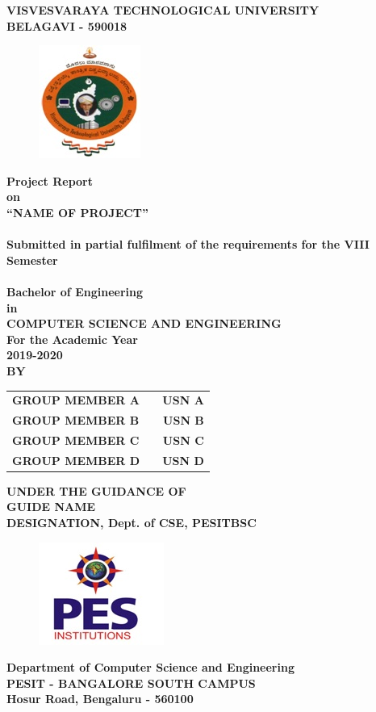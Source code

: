 \newpage
\begin{center}
\thispagestyle{empty}
\Large{\textbf{VISVESVARAYA TECHNOLOGICAL UNIVERSITY\\ \large{BELAGAVI - 590018}}}\\
\begin{figure}[h]
	\centering
	\includegraphics[scale=0.8]{project/images/vtu_new_logo}
	\label{fig:vtulogo}
\end{figure}
\large{\textbf{Project Report\\ on \\}}
\LARGE{\textsc {\textbf{``NAME OF PROJECT''}}}\\
\large{\textbf{\\Submitted in partial fulfilment of the requirements for the VIII Semester\\}}
\Large{\textbf{\\Bachelor of Engineering \\ in \\ COMPUTER SCIENCE AND ENGINEERING\\ For the Academic Year \\ 2019-2020}}
\Large{\textbf{\\BY}}\\
\begin{table}[h]
\centering
\Large{
\begin{tabular}{>{\bfseries}lc>{\bfseries}r}
GROUP MEMBER A & & USN A\\GROUP MEMBER B & & USN B\\GROUP MEMBER C & & USN C\\GROUP MEMBER D & & USN D\\
\end{tabular}}
\end{table}
\vspace{0.5cm}
\large{\textbf{UNDER THE GUIDANCE OF}}\\
\large{\textbf{GUIDE NAME}}\\
\large{\textbf{DESIGNATION, Dept. of CSE, PESITBSC}}\\
\begin{figure}[h]
	\centering
	\includegraphics[scale = 1]{project/images/pesitbsc_logo}
	\label{fig:pesitbsclogo}
\end{figure}
\Large{\textbf{Department of Computer Science and Engineering}}\\
\Large{\textbf{PESIT - BANGALORE SOUTH CAMPUS}}
\large{\textbf{\\Hosur Road, Bengaluru - 560100}}\\
\newpage
\end{center}